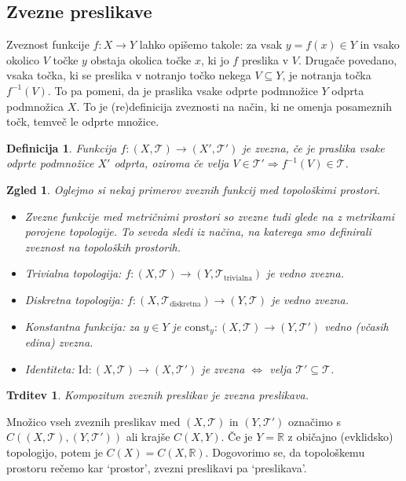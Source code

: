 \documentclass[10pt, a4paper]{article}
\newtheorem{trditev}[izr]{Trditev}
\newtheorem{defi}{Definicija}[section]
\newenvironment{noticeB}{%
  \tcolorbox[%
  notitle,
  empty,
  enhanced,  %
  breakable,
  coltext=black,
  colback=white, 
  fontupper=\rmfamily,
  parbox=false,
  noparskip,
  sharp corners,
  boxrule=-1pt,  %
  frame hidden,
  left=7pt,  %
  right=7pt,
  top=5pt,
  bottom=5pt,
  before skip=2.5ex plus 2pt,
  after skip=2.5ex plus 2pt,
  borderline west = {1.5pt}{-0.1pt}{blue!30!black}, %
  overlay unbroken and last={%
    \draw[color=black, line width=1.25pt]
    ($(frame.south west)+(1.pt, -0.1pt)$) -- ++(2em, 0);
  }
  ]}
{\endtcolorbox}
\newenvironment{definicija}{\begin{noticeB}\begin{defi}}{%
    \end{defi}\end{noticeB}}
\newtheorem{zgled}{Zgled}[section]
\newcommand{\R}{\mathbb {R}}
\begin{document}
\subsection{Zvezne preslikave}

Zveznost funkcije $f: X \to Y$ lahko opišemo takole: za vsak $y = f(x) \in Y$
in vsako okolico $V$ točke $y$ obstaja okolica točke $x$, ki jo $f$ preslika v $V$.
Drugače povedano, vsaka točka, ki se preslika v notranjo točko nekega $V \subseteq Y$,
je notranja točka $f^{-1} (V)$. To pa pomeni, da je praslika vsake odprte podmnožice $Y$ odprta podmnožica $X$.
To je (re)definicija zveznosti na način, ki ne omenja posameznih točk, temveč le odprte množice.

\begin{definicija}
  Funkcija $f: (X, \mathcal{T}) \to (X', \mathcal{T}')$ je zvezna, če je praslika 
  vsake odprte podmnožice $X'$ odprta, oziroma če velja $V \in \mathcal{T}' \Rightarrow f^{-1} (V) \in \mathcal{T}$.
\end{definicija}

\begin{zgled}
  Oglejmo si nekaj primerov zveznih funkcij med topološkimi prostori.
  \begin{itemize}
    \item Zvezne funkcije med metričnimi prostori so zvezne tudi glede na z metrikami porojene topologije.
    To seveda sledi iz načina, na katerega smo definirali zveznost na topoloških prostorih.
    \item Trivialna topologija: $f: (X, \mathcal{T}) \to (Y, \mathcal{T}_{\text{trivialna}})$ je vedno zvezna.
    \item Diskretna topologija: $f: (X, \mathcal{T}_{\text{diskretna}}) \to (Y, \mathcal{T})$ je vedno zvezna.
    \item Konstantna funkcija: za $y \in Y$ je $\mathrm{const}_y : (X, \mathcal{T}) \to (Y, \mathcal{T}')$ vedno (včasih edina) zvezna.
    \item Identiteta: $\mathrm{Id}: (X, \mathcal{T}) \to (X, \mathcal{T'})$ je zvezna $\Leftrightarrow$ velja $\mathcal{T}' \subseteq \mathcal{T}$.
  \end{itemize}
\end{zgled}

\begin{trditev}
  Kompozitum zveznih preslikav je zvezna preslikava.
\end{trditev}

Množico vseh zveznih preslikav med $(X, \mathcal{T})$ in $(Y, \mathcal{T}')$ označimo s $C((X, \mathcal{T}), (Y, \mathcal{T}'))$ ali krajše $C(X, Y)$.
Če je $Y = \R$ z običajno (evklidsko) topologijo, potem je $C(X) = C(X, \R)$.
Dogovorimo se, da topološkemu prostoru rečemo kar  `prostor', zvezni preslikavi pa `preslikava'.
\end{document}
